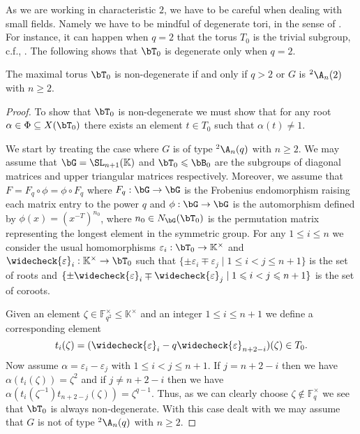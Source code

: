 \documentclass[eqthmnum, nocolour]{jt-calcs}
\begin{document}
\begin{pa}
As we are working in characteristic $2$, we have to be careful when dealing with small fields. Namely we have to be mindful of degenerate tori, in the sense of \cite[3.6.1]{carter:1993:finite-groups-of-lie-type}. For instance, it can happen when $q=2$ that the torus $T_0$ is the trivial subgroup, c.f., \cite[3.6.7]{carter:1993:finite-groups-of-lie-type}. The following shows that $\bT_0$ is degenerate only when $q = 2$.
\end{pa}

\begin{lem}\label{lem:non-degen-tori}
The maximal torus $\bT_0$ is non-degenerate if and only if $q > 2$ or $G$ is ${}^2\A_n(2)$ with $n \geqslant 2$.
\end{lem}

\begin{proof}
To show that $\bT_0$ is non-degenerate we must show that for any root $\alpha \in \Phi \subseteq X(\bT_0)$ there exists an element $t \in T_0$ such that $\alpha(t) \neq 1$.

We start by treating the case where $G$ is of type ${}^2\A_n(q)$ with $n \geqslant 2$. We may assume that $\bG = \SL_{n+1}(\mathbb{K})$ and $\bT_0 \leqslant \bB_0$ are the subgroups of diagonal matrices and upper triangular matrices respectively. Moreover, we assume that $F = F_q \circ\phi = \phi \circ F_q$ where $F_q : \bG \to \bG$ is the Frobenius endomorphism raising each matrix entry to the power $q$ and $\phi : \bG \to \bG$ is the automorphism defined by $\phi(x) = (x^{-T})^{n_0}$, where $n_0 \in N_{\bG}(\bT_0)$ is the permutation matrix representing the longest element in the symmetric group. For any $1 \leqslant i \leqslant n$ we consider the usual homomorphisms $\varepsilon_i : \bT_0 \to \mathbb{K}^{\times}$ and $\widecheck{\varepsilon}_i : \mathbb{K}^{\times} \to \bT_0$ such that $\{\pm\varepsilon_i \mp \varepsilon_j \mid 1 \leqslant i < j \leqslant n+1\}$ is the set of roots and $\{\pm\widecheck{\varepsilon}_i \mp \widecheck{\varepsilon}_j \mid 1 \leqslant i < j \leqslant n+1\}$ is the set of coroots.

Given an element $\zeta \in \mathbb{F}_{q^2}^{\times} \leqslant \mathbb{K}^{\times}$ and an integer $1 \leqslant i \leqslant n+1$ we define a corresponding element
\begin{equation*}
t_i(\zeta) = (\widecheck{\varepsilon}_i - q\widecheck{\varepsilon}_{n+2-i})(\zeta) \in T_0.
\end{equation*}
Now assume $\alpha = \varepsilon_i - \varepsilon_j$ with $1 \leqslant i < j \leqslant n+1$. If $j = n+2-i$ then we have $\alpha(t_i(\zeta)) = \zeta^2$ and if $j \neq n+2-i$ then we have $\alpha(t_i(\zeta^{-1})t_{n+2-j}(\zeta)) = \zeta^{q-1}$. Thus, as we can clearly choose $\zeta \not\in \mathbb{F}_q^{\times}$ we see that $\bT_0$ is always non-degenerate. With this case dealt with we may assume that $G$ is not of type ${}^2\A_n(q)$ with $n \geqslant 2$.


\end{proof}
\end{document}

